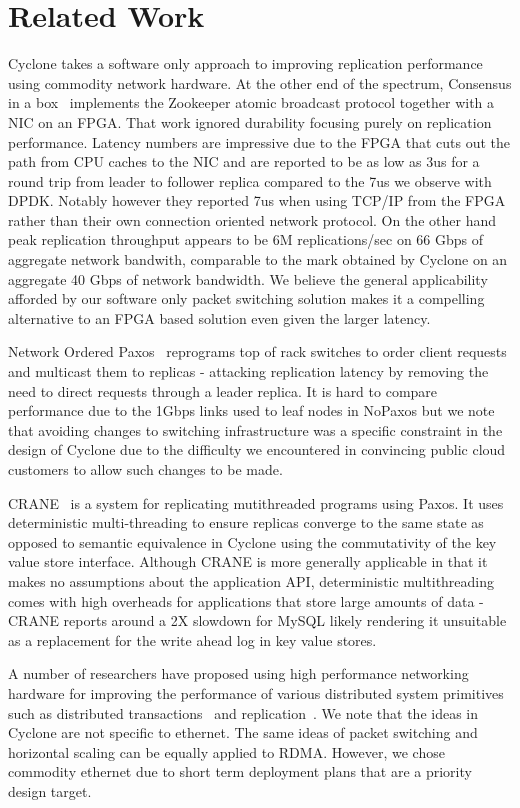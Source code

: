 \documentclass[10pt, preprint, nonatbib]{sigplanconf}
\begin{document}
\section{Related Work}

Cyclone takes a software only approach to improving replication performance
using commodity network hardware. At the other end of the spectrum, Consensus in
a box~\cite{consensus_box} implements the Zookeeper atomic broadcast protocol
together with a NIC on an FPGA. That work ignored durability focusing purely on
replication performance. Latency numbers are impressive due to the FPGA that cuts
out the path from CPU caches to the NIC and are reported to be as low as 3us for
a round trip from leader to follower replica compared to the 7us we observe with
DPDK. Notably however they reported 7us when using TCP/IP from the FPGA rather
than their own connection oriented network protocol. On the other hand peak
replication throughput appears to be 6M replications/sec on 66 Gbps of aggregate
network bandwith, comparable to the mark obtained by Cyclone on an aggregate 40
Gbps of network bandwidth. We believe the general applicability afforded by our
software only packet switching solution makes it a compelling alternative to an
FPGA based solution even given the larger latency.

Network Ordered Paxos~\cite{nopaxos} reprograms top of rack switches to order
client requests and multicast them to replicas - attacking replication latency
by removing the need to direct requests through a leader replica. It is hard to
compare performance due to the 1Gbps links used to leaf nodes in NoPaxos but we
note that avoiding changes to switching infrastructure was a specific constraint
in the design of Cyclone due to the difficulty we encountered in convincing
public cloud customers to allow such changes to be made.

{CRANE}~\cite{crane} is a system for replicating mutithreaded programs using
Paxos. It uses deterministic multi-threading to ensure replicas converge to the
same state as opposed to semantic equivalence in Cyclone using the commutativity
of the key value store interface. Although CRANE is more generally applicable in
that it makes no assumptions about the application API, deterministic
multithreading comes with high overheads for applications that store large
amounts of data - CRANE reports around a 2X slowdown for MySQL likely rendering
it unsuitable as a replacement for the write ahead log in key value stores.

A number of researchers have proposed using high performance networking hardware
for improving the performance of various distributed system primitives such as
distributed transactions~\cite{farm} and replication~\cite{dare, mojim}. We note
that the ideas in Cyclone are not specific to ethernet. The same ideas of packet
switching and horizontal scaling can be equally applied to RDMA. However, we
chose commodity ethernet due to short term deployment plans that are a
priority design target. 
\end{document}
